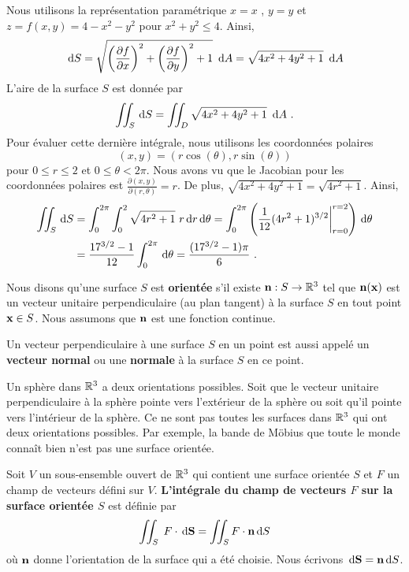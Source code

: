 {\begin{egg}
Nous utilisons la représentation paramétrique $x = x$ , $y = y$ et
$z = f(x,y) = 4 - x^2 - y^2$ pour $x^2 + y^2 \leq 4$.   Ainsi,
\[
\,\mathrm{d}S = \sqrt{ \left(\frac{\partial f}{\partial x}\right)^2 +
  \left(\frac{\partial f}{\partial y}\right)^2 + 1}\ \,\mathrm{d}A
  = \sqrt{ 4x^2 + 4y^2 + 1}\ \,\mathrm{d}A
\]
L'aire de la surface $S$ est donnée par
\[
  \iint_S \,\mathrm{d}S = \iint_D \sqrt{ 4x^2 + 4y^2 + 1}\ \,\mathrm{d}A \ .
\]
Pour évaluer cette dernière intégrale, nous utilisons les coordonnées
polaires
\[
  (x,y) = (r \cos(\theta), r \sin(\theta))
\]
pour $0 \leq r \leq 2$ et $0 \leq \theta < 2\pi$.   Nous avons vu que
le Jacobian pour les coordonnées polaires est
$\displaystyle \frac{\partial(x,y)}{\partial(r,\theta)} = r $.  De
plus, $\sqrt{ 4x^2 + 4y^2 + 1} = \sqrt{4r^2 +1}$.  Ainsi,
\begin{align*}
\iint_S \,\mathrm{d}S &= \int_0^{2\pi} \int_0^2 \sqrt{ 4r^2 + 1}\ r \,\mathrm{d}r
 \,\mathrm{d}\theta
= \int_0^{2\pi} \left(\frac{1}{12} (4r^2 + 1)^{3/2}\bigg|_{r=0}^{r=2} \right)  
 \,\mathrm{d}\theta \\
&= \frac{17^{3/2} -1}{12} \int_0^{2\pi} \,\mathrm{d}\theta
= \frac{(17^{3/2} -1)\pi}{6} \ .
\end{align*}
\end{egg}

\begin{defn} 
Nous disons qu'une surface $S$ est {\bfseries orientée} s'il existe
$\mathbf{n}:S\rightarrow \mathbb{R}^3$ tel que $\mathbf{n}(\mathbf{x})$ est un
vecteur unitaire perpendiculaire (au plan tangent) à la surface
$S$ en tout point $\mathbf{x} \in S$.  Nous assumons que
$\mathbf{n}$ est une fonction continue.
\end{defn}

\begin{defn}
Un vecteur perpendiculaire à une surface $S$ en un point est aussi
appelé un {\bfseries vecteur normal} ou une
{\bfseries normale} à la surface $S$ en ce point. 
\end{defn}

Un sphère dans $\mathbb{R}^3$ a deux orientations possibles.  Soit que le
vecteur unitaire perpendiculaire à la sphère pointe vers l'extérieur
de la sphère ou soit qu'il pointe vers l'intérieur de la sphère.
Ce ne sont pas toutes les surfaces dans $\mathbb{R}^3$ qui ont deux
orientations possibles.  Par exemple, la bande de Möbius que toute le
monde connaît bien n'est pas une surface orientée.

\begin{defn}
Soit $V$ un sous-ensemble ouvert de $\mathbb{R}^3$ qui contient une surface
orientée $S$ et $F$ un champ de vecteurs défini sur $V$.
{\bfseries L'intégrale du champ de vecteurs $F$ sur la surface
orientée $S$} est définie par
\[
\iint_S\; F \cdot \,\mathrm{d}\mathbf{S} = \iint_S F \cdot \mathbf{n} \,\mathrm{d}S
\]
où $\mathbf{n}$ donne l'orientation de la surface qui a été choisie.
Nous écrivons $\,\mathrm{d}\mathbf{S} = \mathbf{n} \,\mathrm{d}S$.
\end{defn}

}
